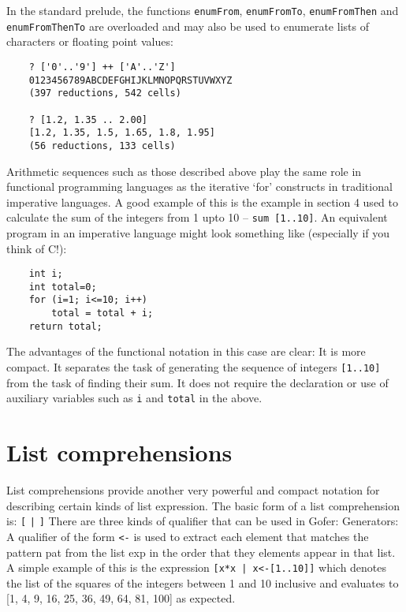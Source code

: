 \EQ
In  the  standard  prelude,   the   functions   \verb"enumFrom",
\verb"enumFromTo",
\verb"enumFromThen" and \verb"enumFromThenTo" 
are overloaded and may also be used  to
enumerate lists of characters or floating point values:
\begin{verbatim}
    ? ['0'..'9'] ++ ['A'..'Z']
    0123456789ABCDEFGHIJKLMNOPQRSTUVWXYZ
    (397 reductions, 542 cells)

    ? [1.2, 1.35 .. 2.00]
    [1.2, 1.35, 1.5, 1.65, 1.8, 1.95]
    (56 reductions, 133 cells)
\end{verbatim}
Arithmetic sequences such as those described above play the  same  role
in functional programming languages as the iterative  `for'  constructs
in traditional imperative languages.  A good example  of  this  is  the
example in section 4 used to calculate the sum of the integers  from  1
upto 10 -- \verb"sum [1..10]".   An  equivalent  program  in  an  imperative
language might look something like (especially if you think of C!):
\begin{verbatim}
    int i;
    int total=0;
    for (i=1; i<=10; i++)
        total = total + i;
    return total;
\end{verbatim}
The advantages of the functional notation in this case are clear:
\BSI
\IT  It is more compact.
\IT  It separates the task of  generating  the  sequence  of  integers
      \verb"[1..10]" from the task of finding their sum.
\IT  It does not require the declaration or use of auxiliary variables
      such as \verb"i" and \verb"total" in the above.
\ESI


\section{List comprehensions}
List comprehensions provide another very powerful and compact  notation
for describing certain kinds of list expression.  The basic form  of  a
list comprehension is:
\BQ
    \verb"["  \verb"|"  \verb"]"
\EQ
There are three kinds of qualifier that can be used in Gofer:
\BI
\IT  Generators: A qualifier of the form  \verb"<-" 
     is  used  to  extract
     each element that matches the pattern pat from the list exp in the
     order that they elements appear in that list.  A simple example of
     this is the expression \verb"[x*x | x<-[1..10]]" which denotes  the  list
     of the squares of the integers between  1  and  10  inclusive  and
     evaluates to [1, 4, 9, 16, 25, 36, 49, 64, 81, 100] as expected.

